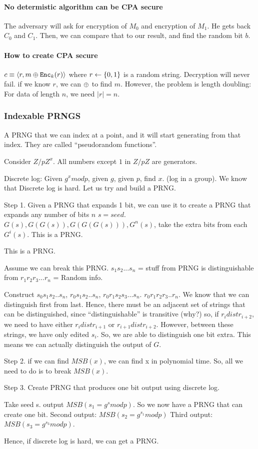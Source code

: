 \paragraph{No determistic algorithm can be CPA secure}
The adversary will ask for encryption of $M_0$ and encryption of $M_1$. He gets
back $C_0$ and $C_1$. Then, we can compare that to our result, and find the
random bit $b$.


\paragraph{How to create CPA secure}
$c \equiv \langle r, m \oplus \texttt{Enc}_k(r) \rangle$ where $r \leftarrow \{0, 1\}$ is a random string.
Decryption will never fail. if we know $r$, we can $\oplus$ to find $m$. However,
the problem is length doubling: For data of length $n$, we need $|r| = n$.

\subsubsection{Indexable PRNGS}
A PRNG that we can index at a point, and it will start generating from that index. They are called ``pseudorandom functions''.

Consider $Z/pZ^x$. All numbers except $1$ in $Z/pZ$ are generators.

Discrete log: Given $g^x mod p$, given $g$, given $p$, find $x$. (log in a group). We know that Discrete log is hard. Let us try and build a PRNG.


Step 1. Given a PRNG that expands 1 bit, we can use it to create a PRNG that expands any number of bits $n$
$s = seed$. 
$G(s), G(G(s)), G(G(G(s))), G^n(s)$, take the extra bits from each $G^i(s)$. This is a PRNG.

This is a PRNG.

Assume we can break this PRNG. $s_1 s_2 ... s_n$ = stuff from PRNG is distinguishable from $r_1 r_2 r_3 ... r_n$ = Random info.

Construct $s_0 s_1 s_2 .. s_n$, $r_0 s_1 s_2.. s_n$, $r_0 r_1 s_2 s_3 ... s_n$. $r_0 r_1 r_2 r_3 .. r_n$. We know that we can
distinguish first from last. Hence, there must be an adjacent set of strings that can be distinguished, since ``distinguishable'' is transitive (why?)
so, if $r_i  dist r_{i+2}$, we need to have either $r_i dist r_{i + 1}$ or $r_{i + 1} dist r_{i + 2}$. However, between these strings, we have only edited $s_i$.
So, we are able to distinguish one bit extra. This means we can actually distinguish the output of $G$.


Step 2. if we can find $MSB(x)$, we can find x in polynomial time. So, all we need to do is to break $MSB(x)$.


Step 3. Create PRNG that produces one bit output using discrete log.

Take seed s. output $MSB(s_1 = g^s mod p)$. So we now have a PRNG that can create one bit. Second output: $MSB(s_2 = g^{s_1} mod p )$
Third output: $MSB(s_3 = g^{s_3} mod p)$.

Hence, if discrete log is hard, we can get a PRNG. 
